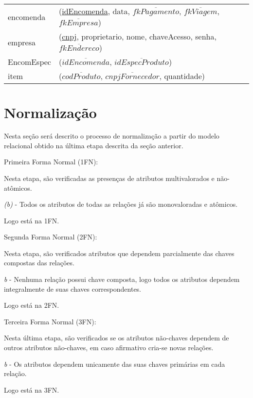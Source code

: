 \documentclass[12pt, onecolumn, titlepage]{article}
\begin{document}
\begin{table}[htb!]
\begin{center}
\begin{tabular}{p{2.5cm} p{10.5cm}}
encomenda & (\underline{idEncomenda}, data, $\overline{fkPagamento}$, $\overline{fkViagem}$, $\overline{fkEmpresa}$)\\
empresa & (\underline{cnpj}, proprietario, nome, chaveAcesso, senha, $\overline{fkEndereco}$)\\
EncomEspec & (\underline{$\overline{idEncomenda}$}, \underline{$\overline{idEspecProduto}$})\\
item & (\underline{$\overline{codProduto}$}, \underline{$\overline{cnpjFornecedor}$}, quantidade)
\end{tabular}
\end{center}
\end{table}

\newpage
\section{Normalização}
Nesta seção será descrito o processo de normalização a partir do modelo relacional obtido na última etapa descrita da seção anterior.

\begin{description}

\item Primeira Forma Normal (1FN):

Nesta etapa, são verificadas as presenças de atributos multivalorados e não-atômicos.

\textit{(b)} - Todos os atributos de todas as relações já são monovaloradas e atômicos.

Logo está na 1FN.

\item Segunda Forma Normal (2FN):

Nesta etapa, são verificados atributos que dependem parcialmente das chaves compostas das relações.

\textit{b} - Nenhuma relação possui chave composta, logo todos os atributos dependem integralmente de suas chaves correspondentes.

Logo está na 2FN.

\item Terceira Forma Normal (3FN):

Nesta última etapa, são verificados se os atributos não-chaves dependem de outros atributos não-chaves, em caso afirmativo cria-se novas relações.

\textit{b} - Os atributos dependem unicamente das suas chaves primárias em cada relação.

Logo está na 3FN.
\end{description} 
\end{document}
